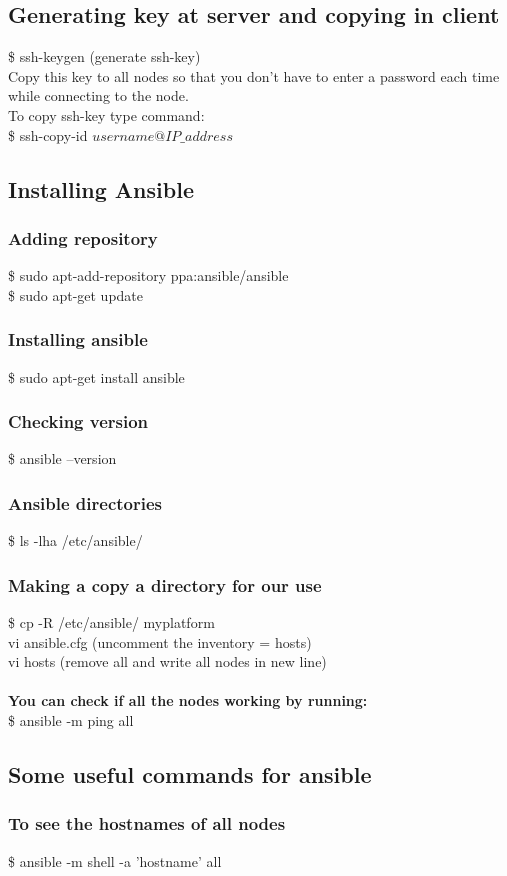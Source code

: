 \documentclass[12pt]{article}
\begin{document}
\subsection{Generating key at server and copying in client}
\$ ssh-keygen (generate ssh-key)\\
Copy this key to all nodes so that you don’t have to enter a password each time while connecting to the node.\\
To copy ssh-key type command:\\
\$ ssh-copy-id $username@IP\_address$
\subsection{Installing Ansible}
\subsubsection{Adding repository}
\$ sudo apt-add-repository ppa:ansible/ansible\\
\$ sudo apt-get update
\subsubsection{Installing ansible}
\$ sudo apt-get install ansible
\subsubsection{Checking version}
\$ ansible  --version
\subsubsection{Ansible directories}
\$ ls -lha /etc/ansible/
\subsubsection{Making a copy a directory for our use}
\$ cp -R /etc/ansible/ myplatform\\
vi ansible.cfg (uncomment the inventory =  hosts)\\
vi hosts (remove all and write all nodes in new line)\\\\
\textbf{You can check if all the nodes working by running:}\\
\$ ansible -m ping all
\subsection{Some useful commands for ansible}
\subsubsection{To see the hostnames of all nodes}
\$ ansible -m shell -a 'hostname' all
\end{document}
